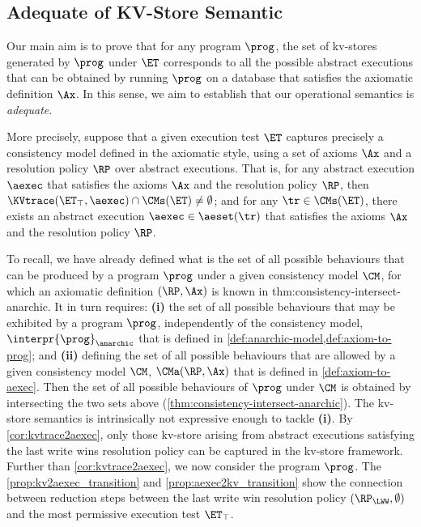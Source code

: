 \subsection{Adequate of KV-Store Semantic}

Our main aim is to prove that for any program $\prog$, 
the set of  kv-stores generated by $\prog$ under $\ET$ 
corresponds to all the possible abstract executions that 
can be obtained by running $\prog$ on a database that satisfies the axiomatic definition $\Ax$. 
In this sense, we aim to establish that our operational semantics is \emph{adequate}.

More precisely, suppose that a given execution test $\ET$ captures precisely 
a consistency model defined in the axiomatic style, using a set of 
axioms $\Ax$ and a resolution policy $\RP$ over abstract executions.
That is, for any abstract execution $\aexec$ that satisfies 
the axioms $\Ax$ and the resolution policy $\RP$, then $\KVtrace(\ET_{\top}, \aexec) \cap \CMs(\ET) \neq \emptyset$; 
and for any $\tr \in \CMs(\ET)$, there exists an abstract execution 
$\aexec \in \aeset(\tr)$ that satisfies the axioms $\Ax$ and the resolution policy $\RP$. 

To recall, we have already defined what is the set of all possible behaviours 
that can be produced by a program $\prog$ under a given consistency model $\CM$, for 
which an axiomatic definition $(\RP, \Ax)$ is known in {thm:consistency-intersect-anarchic}. 
It in turn requires: 
\textbf{(i)} the set of all possible behaviours that may be exhibited by a program $\prog$, independently of the consistency model, 
\ie \( \interpr{\prog}_{\anarchic} \) that is defined in \cref{def:anarchic-model,def:axiom-to-prog}; 
and \textbf{(ii)} defining the set of all possible behaviours that 
are allowed by a given consistency model $\CM$, 
\ie \( \CMa(\RP,\Ax) \) that is defined in \cref{def:axiom-to-aexec}.
Then the set of all possible behaviours of $\prog$ under $\CM$ 
is obtained by intersecting the two sets above (\cref{thm:consistency-intersect-anarchic}).
The kv-store semantics is intrinsically not expressive enough to tackle \textbf{(i)}. 
By \cref{cor:kvtrace2aexec}, only those kv-store arising from
abstract executions satisfying the last write wins resolution policy 
can be captured in the kv-store framework.
Further than \cref{cor:kvtrace2aexec}, we now consider the program \( \prog \).
The \cref{prop:kv2aexec_transition} and \cref{prop:aexec2kv_transition} show 
the connection between reduction steps between 
the last write win resolution policy \( (\RP_{\LWW}, \emptyset) \) 
and the most permissive execution test \( \ET_\top \).


